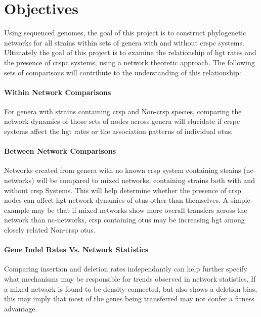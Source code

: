 \section*{\huge Objectives}
Using sequenced genomes, the goal of this project is to construct phylogenetic networks for all strains within sets of genera with and without \ac{crspc} systems.
Ultimately the goal of this project is to examine the relationship of \ac{hgt} rates and the presence of \ac{crspc} systems, using a network theoretic approach. The following sets of comparisons will contribute to the understanding of this relationship:
\paragraph*{Within Network Comparisons}%
For genera with strains containing \ac{crsp} and Non-\ac{crsp} species, comparing the network dynamics of those sets of nodes across genera will elucidate if \ac{crspc} systems affect the \ac{hgt} rates or the association patterns of individual \ac{otu}s.
\paragraph*{Between Network Comparisons}%
Networks created from genera with no known \ac{crsp} system containing strains (nc-networks) will be compared to mixed networks, containing strains both with and without \ac{crsp} Systems.
This will help determine whether the presence of \ac{crsp} nodes can affect \ac{hgt} network dynamics of \ac{otu}s other than themselves.
A simple example may be that if mixed networks show more overall transfers across the network than nc-networks, \ac{crsp} containing \ac{otu}s may be increasing \ac{hgt} among closely related Non-\ac{crsp} \ac{otu}s.
\paragraph*{Gene Indel Rates Vs. Network Statistics}%
Comparing insertion and  deletion rates independantly can help further specify what mechanisms may be responsible for trends observed in network statistics.
If a mixed network is found to be density connected, but also shows a deletion bias, this may imply that most of the genes being transferred may not confer a fitness advantage.
